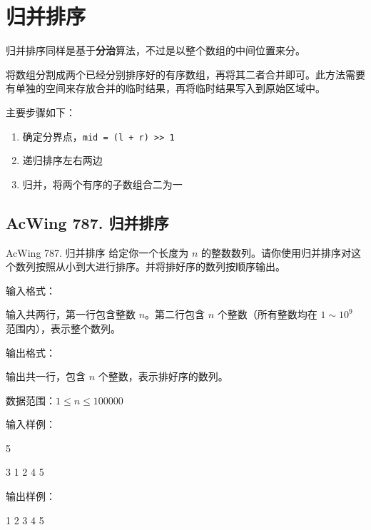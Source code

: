 \section{归并排序}
归并排序同样是基于\textbf{分治}算法，不过是以整个数组的中间位置来分。

将数组分割成两个已经分别排序好的有序数组，再将其二者合并即可。此方法需要有单独的空间来存放合并的临时结果，再将临时结果写入到原始区域中。

主要步骤如下：
\begin{enumerate}
  \item 确定分界点，\lstinline{mid = (l + r) >> 1}
  \item 递归排序左右两边
  \item 归并，将两个有序的子数组合二为一
\end{enumerate}

\subsection{AcWing 787. 归并排序}
\begin{titledbox}{AcWing 787. 归并排序}
    给定你一个长度为 $n$ 的整数数列。请你使用归并排序对这个数列按照从小到大进行排序。并将排好序的数列按顺序输出。
  
    输入格式：
  
    输入共两行，第一行包含整数 $n$。第二行包含 $n$ 个整数（所有整数均在 $1 \sim 10^9$ 范围内），表示整个数列。
  
    输出格式：
  
    输出共一行，包含 $n$ 个整数，表示排好序的数列。
  
    数据范围：$1 \le n \le 100000$
  
    输入样例：
  
    5
  
    3 1 2 4 5
  
    输出样例：
  
    1 2 3 4 5
\end{titledbox}

